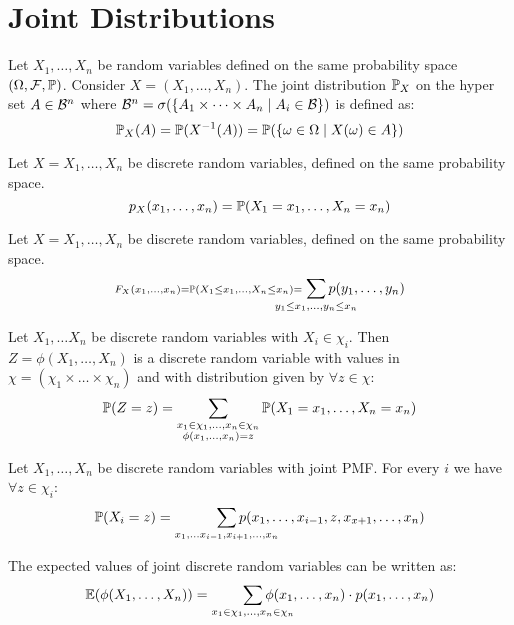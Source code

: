 \section{Joint Distributions}
\begin{definition*}
  Let \(X_1, \ldots, X_n\) be random variables defined on the same probability space \((\O, \F, \P)\). Consider \(X = (X_1, \ldots, X_n)\). The joint distribution \(\P_X\) on the hyper set \(A \in \B^n\) where \(\B^n = \sigma(\{A_1 \times \cdots \times A_n \mid A_i \in \B\})\) is defined as:
  \[\P_X(A) = \P(X^{-1}(A)) = \P(\{\omega \in \O \mid X(\omega) \in A\})\]
\end{definition*}

\begin{ddefinition*}
  Let \(X = X_1, \ldots, X_n\) be discrete random variables, defined on the same probability space.
  \[p_{X}(x_1, \ldots, x_n) = \P(X_1 = x_1, \ldots, X_n = x_n)\]
\end{ddefinition*}

\begin{ddefinition*}
  Let \(X = X_1, \ldots, X_n\) be discrete random variables, defined on the same probability space.
  \[\scriptstyle F_X(x_1, \ldots, x_n) = \P(X_1 \leq x_1, \ldots, X_n \leq x_n) = \smashoperator{\sum_{y_1 \leq x_1, \ldots, y_n \leq x_n}} p(y_1, \ldots, y_n)\]
\end{ddefinition*}

\begin{proposition}
  Let \(X_1, \ldots X_n\) be discrete random variables with \(X_i \in \chi_i\). Then \(Z = \phi(X_1, \ldots, X_n)\) is a discrete random variable with values in \(\chi = (\chi_1 \times \ldots \times \chi_n)\) and with distribution given by \(\forall z \in \chi\):
  \[\P(Z = z) = \sum_{\substack{x_1 \in \chi_1, \ldots, x_n \in \chi_n \\ \phi(x_1, \ldots, x_n) = z}} \P(X_1 = x_1, \ldots, X_n = x_n)\]
\end{proposition}

\begin{dtheorem*}
  Let \(X_1, \ldots, X_n\) be discrete random variables with joint PMF. For every \(i\) we have \(\forall z \in \chi_i\):
  \[\P(X_i = z) = \smashoperator[r]{\sum_{x_1, \ldots x_{i-1}, x_{i+1}, \ldots, x_n}} p(x_1, \ldots, x_{i-1}, z, x_{x+1}, \ldots, x_n)\]
\end{dtheorem*}

\begin{proposition}
  The expected values of joint discrete random variables can be written as:
  \[\E(\phi(X_1, \ldots, X_n)) = \smashoperator[r]{\sum_{x_1 \in \chi_1, \ldots, x_n \in \chi_n}} \phi(x_1, \ldots, x_n) \cdot p(x_1, \ldots, x_n)\]
\end{proposition}

